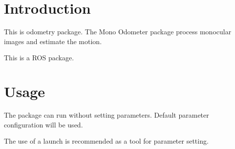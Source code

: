 \hypertarget{index_intro_sec}{}\section{\-Introduction}\label{index_intro_sec}
\-This is odometry package. \-The \-Mono \-Odometer package process monocular images and estimate the motion.

\-This is a \-R\-O\-S package.\hypertarget{index_usage_sec}{}\section{\-Usage}\label{index_usage_sec}
\-The package can run without setting parameters. \-Default parameter configuration will be used.

\-The use of a launch is recommended as a tool for parameter setting. 